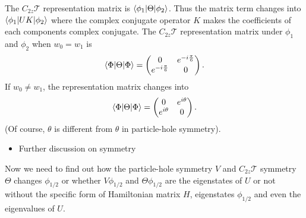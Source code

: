 \documentclass[10pt, oneside]{article}
\newcommand{\te}{\theta}
\newcommand{\ph}{\phi}
\begin{document}
The \(C_{2z}\mathcal{T}\) representation matrix is \(\braket{\phi_{1} | \Theta | \phi_{2}}\). Thus the matrix term changes into \(\braket{\phi_{1} | U K | \phi_{2}}\) where the complex conjugate operator \(K\) makes the coefficients of each components complex conjugate. The \(C_{2z}\mathcal{T}\) representation matrix under \(\ph_1\) and \(\ph_2\) when \(w_0  = w_1\) is 
\begin{align}
	\braket{\Phi | \Theta | \Phi} = \begin{pmatrix}
		0 & e^{-i \frac{\pi}{6}} \\
		e^{-i \frac{\pi}{6}} & 0
	\end{pmatrix}.
\end{align}
If \(w_0 \neq w_1\), the representation matrix changes into 
\begin{align}
	\braket{\Phi | \Theta | \Phi} = \begin{pmatrix}
		0 & e^{i \te} \\
		e^{i \te} & 0
	\end{pmatrix}.
\end{align}
(Of course, \(\te\) is different from \(\te\) in particle-hole symmetry).


\begin{itemize}
	\item Further discussion on symmetry
\end{itemize}
Now we need to find out how the particle-hole symmetry \(V\) and \(C_{2z} \mathcal{T}\) symmetry \(\Theta\) changes \(\phi_{1/2}\) or whether \(V \phi_{1/2}\) and \(\Theta \phi_{1/2}\) are the eigenstates of \(U\) or not without the specific form of Hamiltonian matrix \(H\), eigenstates \(\phi_{1/2}\) and even the eigenvalues of \(U\).
\end{document}
